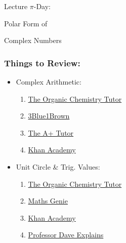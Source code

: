 \documentclass[12pt,xcolor={usenames,dvipsnames,x11names}]{beamer}
\begin{document}
{
\begin{frame}[b,plain]
\phantom{.}\par
\phantom{.}\hfill{\Large\color{egold} Lecture $\pi$-Day:} \hfill\phantom{.}\pvspace{0.1cm}
\phantom{.}\hfill{\Large\color{egold} Polar Form of\; \hfill \phantom{.} \par\vspace{0.1cm} \phantom{.} \hfill Complex Numbers} \hfill \phantom{.} \pvspace{0.2cm}
\end{frame}
}



\begin{frame}[plain] \frametitle{Things to Review:}
\begin{itemize} \itemsep=3ex
\item Complex Arithmetic:
	\begin{enumerate}[--]
	\item \href{https://www.youtube.com/watch?v=OQz1ydBcQSA}{The Organic Chemistry Tutor}
	\item \href{https://www.youtube.com/watch?v=5PcpBw5Hbwo}{3Blue1Brown}
	\item \href{https://www.youtube.com/watch?v=wQnXN0xljR0}{The A+ Tutor}
	\item \href{https://www.youtube.com/watch?v=ysVcAYo7UPI&list=PLXSlB4yMaoJtM2gG5Mas5mMjwX_B51vsB}{Khan Academy}
	\end{enumerate}

\item Unit Circle \& Trig. Values:
	\begin{enumerate}[--]
	\item \href{https://www.youtube.com/watch?v=V5ArB_GFGYQ}{The Organic Chemistry Tutor}
	\item \href{https://www.youtube.com/watch?v=3KYomDEIQgo}{Maths Genie}
	\item \href{https://www.youtube.com/watch?v=1m9p9iubMLU&list=PLSQl0a2vh4HDEMO_W3DWpSgfHIF6AKDz1}{Khan Academy}
	\item \href{https://www.youtube.com/watch?v=75dMcyCUo2g}{Professor Dave Explains}
	\end{enumerate}
\end{itemize}
\end{frame}
\end{document}
